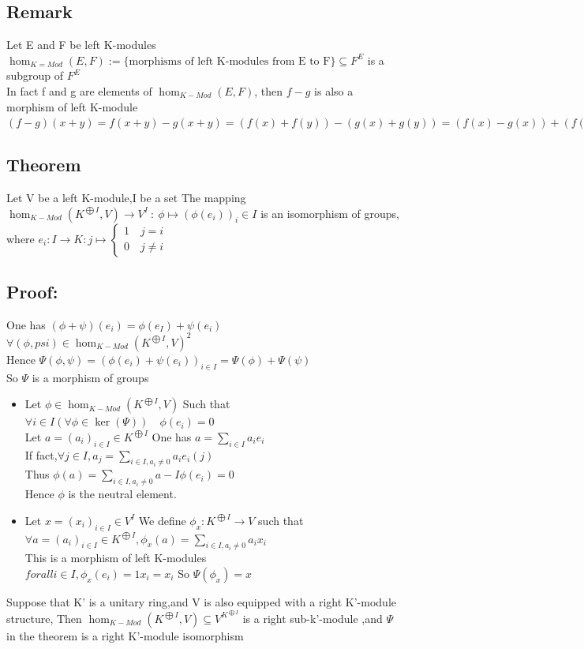 \documentclass{book}
\begin{document}
\subsection{Remark}

Let E and F be left K-modules\\$\hom_{K=Mod}(E,F):=\{\text{morphisms of left K-modules from E to F}\}\subseteq F^E$ is a subgroup of $F^E$\\
In fact f and g are elements of $\hom_{K-Mod}(E,F)$, then $f-g$ is also a morphism of left K-module\\$(f-g)(x+y)=f(x+y)-g(x+y)=(f(x)+f(y))-(g(x)+g(y))=(f(x)-g(x))+(f(y)-g(y))=(f-g)(x)+(f-y)(x)$
\subsection{Theorem}

Let V be a left K-module,I be a set The mapping $\hom_{K-Mod}(K^{\bigoplus I},V)\rightarrow V^I\ :\ \phi\mapsto(\phi(e_i))_i\in I$ is an isomorphism of groups, where $e_i:I\rightarrow K:j\mapsto\left\{\begin{aligned}
    1\quad j=i\\
    0\quad j\not=i
\end{aligned} \right.$
\subsection{Proof:}
One has $(\phi+\psi)(e_i)=\phi(e_I)+\psi(e_i)$\\
$\forall(\phi,psi)\in \hom_{K-Mod}(K^{\bigoplus I},V)^2$\\
Hence $\Psi(\phi,\psi)=(\phi(e_i)+\psi(e_i))_{i\in I}=\Psi(\phi)+\Psi(\psi)$\\
So $\Psi$ is a morphism of groups
\begin{itemize}
    \item [injectivity] Let $\phi\in \hom_{K-Mod}(K^{\bigoplus I},V)$ Such that $\forall i\in I(\forall \phi\in\ker(\Psi))\quad\phi(e_i)=0$\\Let $a =(a_i)_{i\in I}\in K^{\bigoplus I}$ One has $a=\sum\limits_{i\in I}a_ie_i$ \\ If fact,$\forall j\in I,a_j=\sum\limits_{i\in I,a_i\not=0}a_ie_i(j)$\\Thus $\phi(a)=\sum\limits_{i\in I,a_i\not=0}a-I\phi(e_i)=0$\\Hence $\phi$ is the neutral element.
    \item [surjectivity] Let $x=(x_i)_{i\in I}\in V^I$ We define $\phi_x:K^{\bigoplus I}\rightarrow V$ such that $\forall a=(a_i)_{i\in I}\in K^{\bigoplus I},\phi_x(a)=\sum\limits_{i\in I,a_i\not=0}a_ix_i$\\This is a morphism of left K-modules\\$forall i\in I,\phi_x(e_i)=1x_i=x_i$  So $\Psi(\phi_x)=x$
\end{itemize}
{\color{blue}Suppose that K' is a unitary ring,and V is also equipped with a right K'-module structure, Then $\hom_{K-Mod}(K^{\bigoplus I},V)\subseteq V^{K^{\bigoplus I}}$ is a right sub-k'-module ,and $\Psi$ in the theorem is a right K'-module isomorphism}
\end{document}
